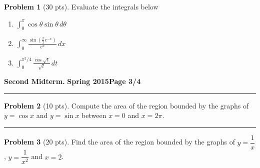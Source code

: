 \documentclass[12pt]{article}
\theoremstyle{definition}
\newtheorem{problem}{Problem}
\begin{document}
\bigskip
\begin{problem}[30 pts]
Evaluate the integrals below

\begin{enumerate}
\item $\displaystyle{\int_0^{\pi} \cos \theta  \sin \theta\, d\theta}$
\vspace{1.5cm}
\begin{flushright}
\end{flushright}

\item $\displaystyle{\int_0^{\infty} \frac{ \sin ( \tfrac{\pi}{2} e^{-x}) }{e^x} \, dx}$
\vspace{2.5cm}
\begin{flushright}
\end{flushright}
\item $\displaystyle{\int_0^{\pi^2/4} \frac{\cos \sqrt{t}}{\sqrt{t}}\, dt}$
\vspace{5cm}
\begin{flushright}
\end{flushright}
\end{enumerate}
\end{problem}
\newpage

\hfill{\large\bf Second Midterm.}\hfill{\large\bf
  Spring 2015}\hfill{\large\bf Page 3/4}\hrule

\bigskip
\begin{problem}[10 pts]
Compute the area of the region bounded by the graphs of $y=\cos x$ and $y=\sin x$ between $x=0$ and $x=2\pi$.
\vspace{8.5cm}
\begin{flushright}
\end{flushright}
\end{problem}
\hrule
\begin{problem}[20 pts]
Find the area of the region bounded by the graphs of $y=\dfrac{1}{x}$, $y=\dfrac{1}{x^2}$ and $x=2$.
\vspace{8.5cm}
\begin{flushright}
\end{flushright}
\end{problem}
\newpage
\end{document}
